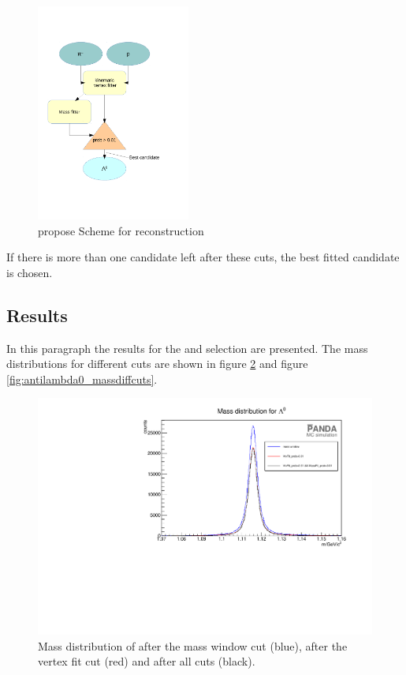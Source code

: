 		\begin{figure}
			\centering
				\includegraphics[width=0.45\textwidth]{./plots/combineLambda0.pdf}
			\caption{propose Scheme for \lam reconstruction}
			\label{fig:lambda_scheme}
		\end{figure}
		
		If there is more than one candidate left after these cuts, the best fitted candidate is chosen.
		
		
	\subsection*{Results}
		In this paragraph the results for the \lam and \alam selection are presented.
		The mass distributions for different cuts are shown in figure \ref{fig:lambda0_massdiffcuts} and figure \ref{fig:antilambda0_massdiffcuts}.
	
		\begin{figure}
			\centering
				\includegraphics[width=1.1\textwidth]{./plots/lambda0/lambda0_m_diffcuts.pdf}
			\caption{\propose Mass distribution of \lam after the mass window cut (blue), after the vertex fit cut (red) and after all cuts (black).}
			\label{fig:lambda0_massdiffcuts}
		\end{figure}
			
